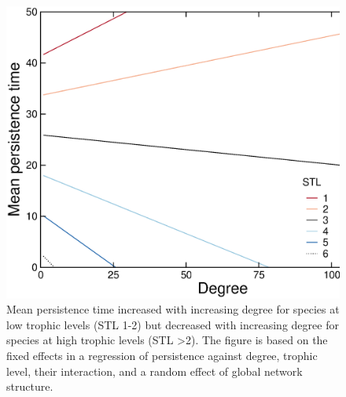\documentclass[12pt]{article}
\begin{document}
    \clearpage

    \begin{figure}[h!]
        \centering
        \includegraphics{figures/roles/persistence_vs_degTL.eps}
        \caption{Mean persistence time increased with increasing degree for species at low trophic levels (STL 1-2) but decreased with increasing degree for species at high trophic levels (STL \textgreater2). The figure is based on the fixed effects in a regression of persistence against degree, trophic level, their interaction, and a random effect of global network structure.}
        \label{fig:persistence_degTL}
    \end{figure}

    \clearpage
\end{document}
